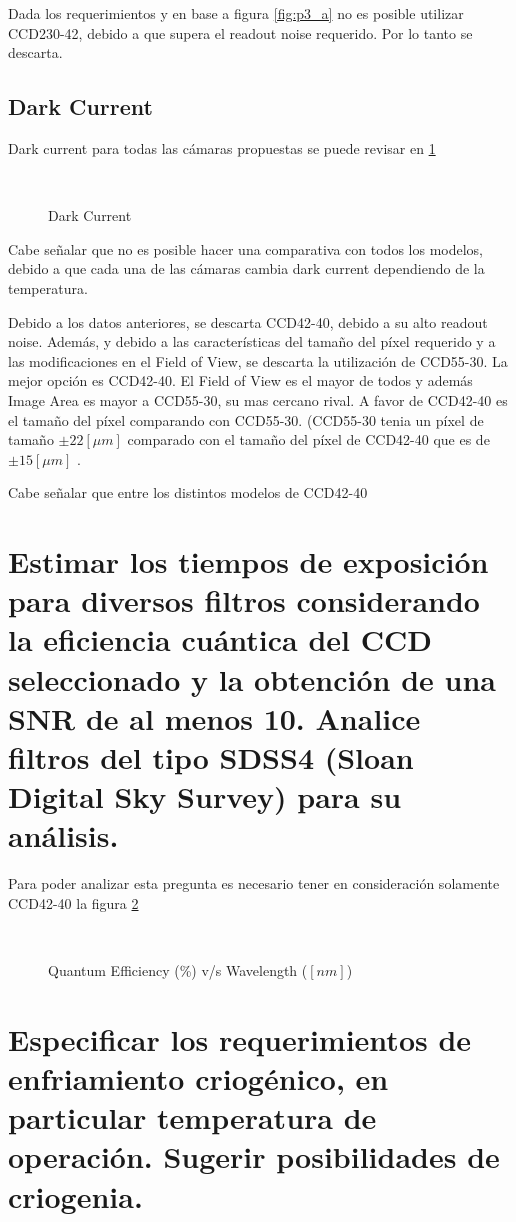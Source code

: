 \documentclass[a4paper,10pt]{article}
\begin{document}
Dada los requerimientos y en base a figura \ref{fig:p3_a}  no es posible
utilizar CCD230-42, debido a que supera el readout noise requerido. Por lo
tanto se descarta. 

\subsection{Dark Current}
Dark current para todas las cámaras propuestas se puede revisar en \ref{fig:p3_c}
\begin{figure}[ht!]
  \centering
  ~ 
  \caption{Dark Current}
  \label{fig:p3_c}
\end{figure}

Cabe señalar que no es posible hacer una comparativa con todos los modelos,
debido a que cada una de las cámaras cambia dark current dependiendo de la
temperatura.

Debido a los datos anteriores, se descarta CCD42-40, debido a su alto readout
noise. Además, y debido a las características del tamaño del píxel requerido y
a las modificaciones en el Field of View, se descarta la utilización de
CCD55-30. La mejor opción es CCD42-40. El Field of View es el mayor de todos y
además Image Area es mayor a CCD55-30, su mas cercano rival. A favor de
CCD42-40 es el tamaño del píxel comparando con CCD55-30. (CCD55-30 tenia un
píxel de tamaño $\pm 22 [\mu m]$ comparado con el tamaño del píxel de CCD42-40
que es de $\pm 15 [\mu m]$ .

Cabe señalar que entre los distintos modelos de CCD42-40 
\section{Estimar los tiempos de exposición para diversos filtros considerando la
eficiencia cuántica del CCD seleccionado y la obtención de una SNR de al menos
10. Analice filtros del tipo SDSS4 (Sloan Digital Sky Survey) para su análisis.}

Para poder analizar esta pregunta es necesario tener en consideración solamente CCD42-40 la figura \ref{fig:p4}

\begin{figure}[ht!]
  \centering
  ~ 
  \caption{Quantum Efficiency (\%) v/s Wavelength ($[nm]$)}
  \label{fig:p4}
\end{figure}

\section{Especificar los requerimientos de enfriamiento criogénico, en particular
temperatura de operación. Sugerir posibilidades de criogenia.}
\end{document}
